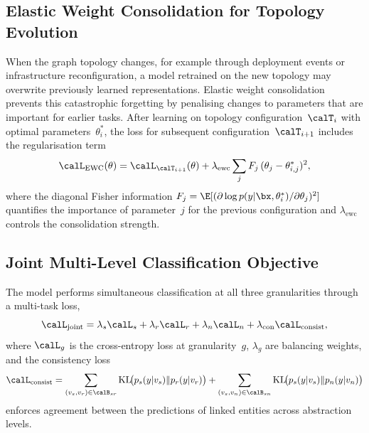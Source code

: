 \subsection{Elastic Weight Consolidation for Topology Evolution}

When the graph topology changes, for example through deployment events or infrastructure reconfiguration, a model retrained on the new topology may overwrite previously learned representations. Elastic weight consolidation~\cite{Kirkpatrick2017,Zenke2017} prevents this catastrophic forgetting by penalising changes to parameters that are important for earlier tasks. After learning on topology configuration~$\calT_i$ with optimal parameters~$\theta_i^*$, the loss for subsequent configuration~$\calT_{i+1}$ includes the regularisation term
\begin{equation}
\calL_{\mathrm{EWC}}(\theta)
= \calL_{\calT_{i+1}}(\theta)
  + \lambda_{\mathrm{ewc}}\sum_j F_j\,(\theta_j - \theta_{i,j}^*)^2,
\label{eq:ewc}
\end{equation}
where the diagonal Fisher information $F_j = \E[(\partial\log p(y|\bx,\theta_i^*)/\partial\theta_j)^2]$ quantifies the importance of parameter~$j$ for the previous configuration and $\lambda_{\mathrm{ewc}}$ controls the consolidation strength.

\subsection{Joint Multi-Level Classification Objective}

The model performs simultaneous classification at all three granularities through a multi-task loss,
\begin{equation}
\calL_{\mathrm{joint}}
= \lambda_s\calL_s + \lambda_r\calL_r + \lambda_n\calL_n
  + \lambda_{\mathrm{con}}\calL_{\mathrm{consist}},
\label{eq:triple_joint}
\end{equation}
where $\calL_g$ is the cross-entropy loss at granularity~$g$, $\lambda_g$ are balancing weights, and the consistency loss
\begin{equation}
\calL_{\mathrm{consist}}
= \sum_{(v_s,v_r)\in\calB_{sr}}
  \mathrm{KL}\!\bigl(p_s(y|v_s)\|p_r(y|v_r)\bigr)
+ \sum_{(v_s,v_n)\in\calB_{sn}}
  \mathrm{KL}\!\bigl(p_s(y|v_s)\|p_n(y|v_n)\bigr)
\label{eq:triple_consist}
\end{equation}
enforces agreement between the predictions of linked entities across abstraction levels.

